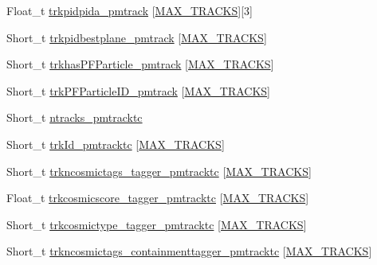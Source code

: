 \begin{DoxyCompactItemize}
\item 
Float\-\_\-t \hyperlink{classanatree_a15e4e0281b72834a80bee0bd4b62b6bf}{trkpidpida\-\_\-pmtrack} \mbox{[}\hyperlink{anatree__core__v09410002__orig_8h_a327fd4e796e4a0d78947524c96e4362e}{M\-A\-X\-\_\-\-T\-R\-A\-C\-K\-S}\mbox{]}\mbox{[}3\mbox{]}
\item 
Short\-\_\-t \hyperlink{classanatree_a827791670ea65487df9280db799a0714}{trkpidbestplane\-\_\-pmtrack} \mbox{[}\hyperlink{anatree__core__v09410002__orig_8h_a327fd4e796e4a0d78947524c96e4362e}{M\-A\-X\-\_\-\-T\-R\-A\-C\-K\-S}\mbox{]}
\item 
Short\-\_\-t \hyperlink{classanatree_a17dccc2e1e357a4d48a853c3c60ec308}{trkhas\-P\-F\-Particle\-\_\-pmtrack} \mbox{[}\hyperlink{anatree__core__v09410002__orig_8h_a327fd4e796e4a0d78947524c96e4362e}{M\-A\-X\-\_\-\-T\-R\-A\-C\-K\-S}\mbox{]}
\item 
Short\-\_\-t \hyperlink{classanatree_a61630bb94d8e1768ff39596d01148676}{trk\-P\-F\-Particle\-I\-D\-\_\-pmtrack} \mbox{[}\hyperlink{anatree__core__v09410002__orig_8h_a327fd4e796e4a0d78947524c96e4362e}{M\-A\-X\-\_\-\-T\-R\-A\-C\-K\-S}\mbox{]}
\item 
Short\-\_\-t \hyperlink{classanatree_afd766c2df1e61b45c609cf32c5f937d1}{ntracks\-\_\-pmtracktc}
\item 
Short\-\_\-t \hyperlink{classanatree_a6d982a56ff1941dd94ae04696f063fda}{trk\-Id\-\_\-pmtracktc} \mbox{[}\hyperlink{anatree__core__v09410002__orig_8h_a327fd4e796e4a0d78947524c96e4362e}{M\-A\-X\-\_\-\-T\-R\-A\-C\-K\-S}\mbox{]}
\item 
Short\-\_\-t \hyperlink{classanatree_a504bc60d1d1f1403c9625a7ea8b6358b}{trkncosmictags\-\_\-tagger\-\_\-pmtracktc} \mbox{[}\hyperlink{anatree__core__v09410002__orig_8h_a327fd4e796e4a0d78947524c96e4362e}{M\-A\-X\-\_\-\-T\-R\-A\-C\-K\-S}\mbox{]}
\item 
Float\-\_\-t \hyperlink{classanatree_a1fb10c3b5cdfe58d35cb63137d612acc}{trkcosmicscore\-\_\-tagger\-\_\-pmtracktc} \mbox{[}\hyperlink{anatree__core__v09410002__orig_8h_a327fd4e796e4a0d78947524c96e4362e}{M\-A\-X\-\_\-\-T\-R\-A\-C\-K\-S}\mbox{]}
\item 
Short\-\_\-t \hyperlink{classanatree_a2ef4e92edce03e3bf308d76de20a66a8}{trkcosmictype\-\_\-tagger\-\_\-pmtracktc} \mbox{[}\hyperlink{anatree__core__v09410002__orig_8h_a327fd4e796e4a0d78947524c96e4362e}{M\-A\-X\-\_\-\-T\-R\-A\-C\-K\-S}\mbox{]}
\item 
Short\-\_\-t \hyperlink{classanatree_a674aee8b1707f77ced823e4cf79ddcc5}{trkncosmictags\-\_\-containmenttagger\-\_\-pmtracktc} \mbox{[}\hyperlink{anatree__core__v09410002__orig_8h_a327fd4e796e4a0d78947524c96e4362e}{M\-A\-X\-\_\-\-T\-R\-A\-C\-K\-S}\mbox{]}

\end{DoxyCompactItemize}
